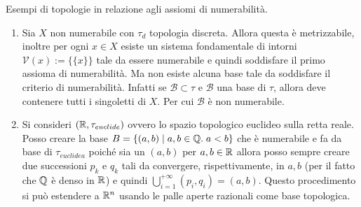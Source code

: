 Esempi di topologie in relazione agli assiomi di numerabilità.
\begin{enumerate}
	\item Sia $X$ non numerabile con $\tau_d$ topologia discreta. Allora questa è metrizzabile, inoltre per ogni $x\in X$ esiste un sistema fondamentale di intorni $\mathcal{V}(x) := \{ \{x \} \}$ tale da essere numerabile e quindi soddisfare il primo assioma di numerabilità. Ma non esiste alcuna base tale da soddisfare il  criterio di numerabilità. Infatti se $\mathcal{B} \subset \tau$ e $\mathcal{B}$ una base di $\tau$, allora deve contenere tutti i singoletti di $X$. Per cui $\mathcal{B}$ è non numerabile.
	\item Si consideri $(\mathbb{R}, \tau_{euclide})$ ovvero lo spazio topologico euclideo sulla retta reale. Posso creare la base $B = \{(a,b) \; | \; a,b \in \mathbb{Q} . \; a < b\}$  che è numerabile e fa da base di $\tau_{euclidea}$ poiché sia un $(a,b)$ per $a,b \in \mathbb{R}$ allora posso sempre creare due successioni $p_k$ e $q_k$ tali da convergere, rispettivamente, in $a, b$  (per il fatto che $\mathbb{Q}$ è denso in $\mathbb{R}$) e quindi $\bigcup_{i=1}^{+\infty}(p_i, q_i) = (a,b)$. Questo procedimento si può estendere a $\mathbb{R}^n$ usando le palle aperte razionali come base topologica.
\end{enumerate}

